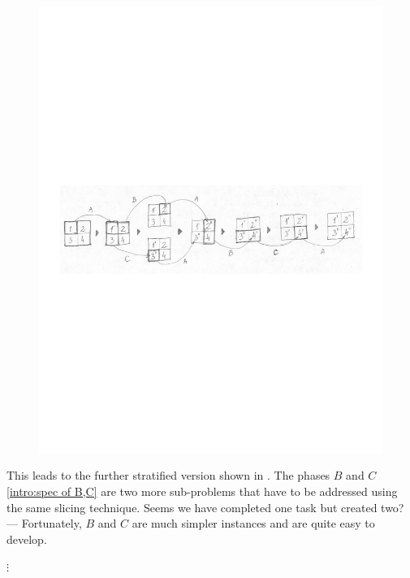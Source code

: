\begin{figure}
\begin{center}
\includegraphics[width=.9\textwidth]{img/gap-stratify-A}
\end{center}
\caption{\label{intro:gap stratify A chain}}
\end{figure}

This leads to the further stratified version shown in .
The phases
$B$ and $C$ \eqref{intro:spec of B,C} are two more sub-problems that have to be addressed using the same slicing technique.
Seems we have completed one task but created two? --- Fortunately, $B$ and $C$ are much simpler instances
and are quite easy to develop.



\begin{center}$\vdots$
\end{center}


